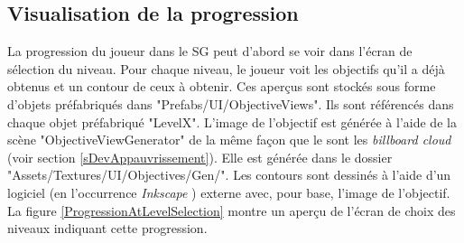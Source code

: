 		\begin{minipage}{\linewidth}
			\label{Teleportation}
		\end{minipage}\medskip%
	
	\subsection*{Visualisation de la progression}
		La progression du joueur dans le SG peut d'abord se voir dans l'écran de sélection du niveau. Pour chaque niveau, le joueur voit les objectifs qu'il a déjà obtenus et un contour de ceux à obtenir. Ces aperçus sont stockés sous forme d'objets préfabriqués dans "Prefabs/UI/ObjectiveViews". Ils sont référencés dans chaque objet préfabriqué "LevelX". L'image de l'objectif est générée à l'aide de la scène "ObjectiveViewGenerator" de la même façon que le sont les \textit{billboard cloud} (voir section \ref{sDevAppauvrissement}). Elle est générée dans le dossier "Assets/Textures/UI/Objectives/Gen/". Les contours sont dessinés à l'aide d'un logiciel (en l'occurrence \textit{Inkscape} \cite{Inkscape_website}) externe avec, pour base, l'image de l'objectif. La figure \ref{ProgressionAtLevelSelection} montre un aperçu de l'écran de choix des niveaux indiquant cette progression.\medskip
		
